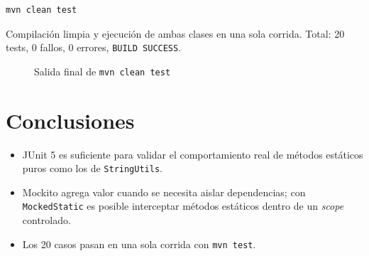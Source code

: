 \documentclass{article}
\begin{document}
\begin{verbatim}
mvn clean test
\end{verbatim}

Compilaci\'on limpia y ejecuci\'on de ambas clases en una sola corrida. Total: 20 tests, 0 fallos, 0 errores, \texttt{BUILD SUCCESS}.

\begin{figure}[H]
\centering
\caption{Salida final de \texttt{mvn clean test}}
\end{figure}

\newpage
\section{Conclusiones}
\begin{itemize}
    \item JUnit 5 es suficiente para validar el comportamiento real de m\'etodos est\'aticos puros como los de \texttt{StringUtils}.
    \item Mockito agrega valor cuando se necesita aislar dependencias; con \texttt{MockedStatic} es posible interceptar m\'etodos est\'aticos dentro de un \textit{scope} controlado.
    \item Los 20 casos pasan en una sola corrida con \texttt{mvn test}.
\end{itemize}
\end{document}
